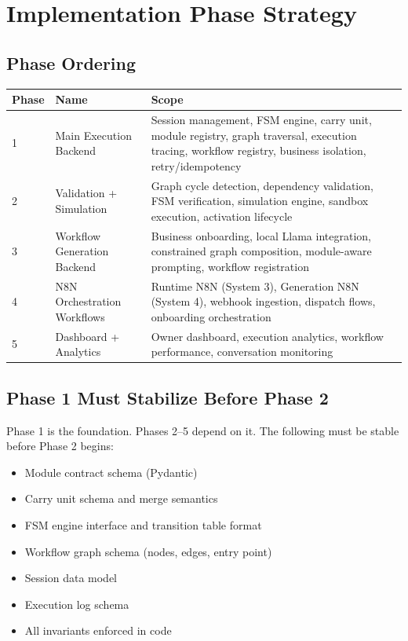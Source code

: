 \documentclass[12pt, a4paper]{report}
\begin{document}
\chapter{Implementation Phase Strategy}

\section{Phase Ordering}

\begin{longtable}{llp{8cm}}
\toprule
\textbf{Phase} & \textbf{Name} & \textbf{Scope} \\
\midrule
1 & Main Execution Backend & Session management, FSM engine, carry unit, module registry, graph traversal, execution tracing, workflow registry, business isolation, retry/idempotency \\
\midrule
2 & Validation + Simulation & Graph cycle detection, dependency validation, FSM verification, simulation engine, sandbox execution, activation lifecycle \\
\midrule
3 & Workflow Generation Backend & Business onboarding, local Llama integration, constrained graph composition, module-aware prompting, workflow registration \\
\midrule
4 & N8N Orchestration Workflows & Runtime N8N (System 3), Generation N8N (System 4), webhook ingestion, dispatch flows, onboarding orchestration \\
\midrule
5 & Dashboard + Analytics & Owner dashboard, execution analytics, workflow performance, conversation monitoring \\
\bottomrule
\end{longtable}

\section{Phase 1 Must Stabilize Before Phase 2}

Phase 1 is the foundation. Phases 2–5 depend on it. The following must be stable before Phase 2 begins:
\begin{itemize}
  \item Module contract schema (Pydantic)
  \item Carry unit schema and merge semantics
  \item FSM engine interface and transition table format
  \item Workflow graph schema (nodes, edges, entry point)
  \item Session data model
  \item Execution log schema
  \item All invariants enforced in code
\end{itemize}
\end{document}
